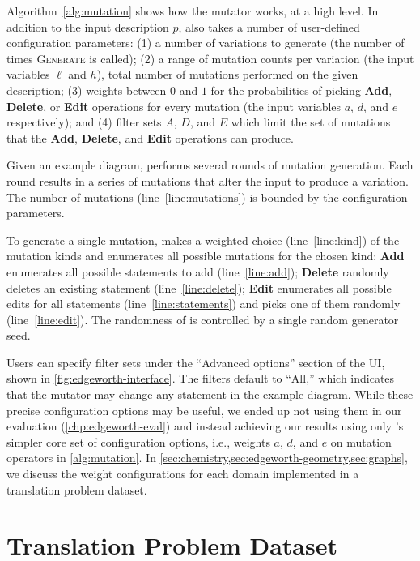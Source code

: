 Algorithm~\ref{alg:mutation} shows how the \Edgeworth mutator works, at a high level. In addition to the input \Substance description $p$, \Edgeworth also takes a number of user-defined configuration parameters: (1) a number of variations to generate (the number of times \textsc{Generate} is called); (2) a range of mutation counts per variation (the input variables $\ell$ and $h$), \ie total number of mutations performed on the given \Substance description; (3) weights between $0$ and $1$ for the probabilities of picking \textbf{Add}, \textbf{Delete}, or \textbf{Edit} operations for every mutation (the input variables $a$, $d$, and $e$ respectively); and (4) filter sets $A$, $D$, and $E$ which limit the set of mutations that the \textbf{Add}, \textbf{Delete}, and \textbf{Edit} operations can produce.

Given an example diagram, \Edgeworth performs several rounds of mutation generation. Each round results in a series of mutations that alter the input to produce a variation. The number of mutations (line~\ref{line:mutations}) is bounded by the configuration parameters.

To generate a single mutation, \Edgeworth makes a weighted choice (line~\ref{line:kind}) of the mutation kinds and enumerates all possible mutations for the chosen kind: \textbf{Add} enumerates all possible statements to add (line~\ref{line:add}); \textbf{Delete} randomly deletes an existing statement (line~\ref{line:delete}); \textbf{Edit} enumerates all possible edits for all statements (line~\ref{line:statements}) and picks one of them randomly (line~\ref{line:edit}). The randomness of \Edgeworth is controlled by a single random generator seed.

Users can specify filter sets under the ``Advanced options'' section of the UI, shown in \cref{fig:edgeworth-interface}. The filters default to ``All,'' which indicates that the mutator may change any statement in the example diagram. While these precise configuration options may be useful, we ended up not using them in our evaluation (\cref{chp:edgeworth-eval}) and instead achieving our results using only \Edgeworth's simpler core set of configuration options, i.e., weights $a$, $d$, and $e$ on mutation operators in \cref{alg:mutation}. In \cref{sec:chemistry,sec:edgeworth-geometry,sec:graphs}, we discuss the weight configurations for each domain implemented in a translation problem dataset.


\section{Translation Problem Dataset}
\label{sec:edgeworth-case-studies}



